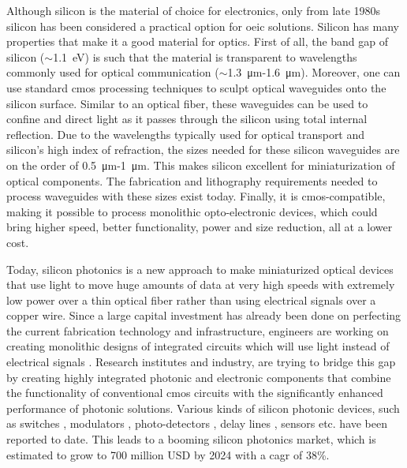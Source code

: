 \documentclass[../report.tex]{subfiles}
\begin{document}
Although silicon is the material of choice for electronics, only from late 1980s silicon has been considered a practical option for \gls{oeic} solutions. Silicon has many properties that make it a good material for optics. First of all, the band gap of silicon ($\sim$\SI{1.1}{\electronvolt}) is such that the material is transparent to wavelengths commonly used for optical communication ($\sim$\SI{1.3}{\micro\metre}-\SI{1.6}{\micro\metre}). Moreover, one can use standard \gls{cmos} processing techniques to sculpt optical waveguides onto the silicon surface. Similar to an optical fiber, these waveguides can be used to confine and direct light as it passes through the silicon \cite{reed_silicon_2004} using total internal reflection. Due to the wavelengths typically used for optical transport and silicon’s high index of refraction, the sizes needed for these silicon waveguides are on the order of \SI{0.5}{\micro\metre}-\SI{1}{\micro\metre}. This makes silicon excellent for miniaturization of optical components. The fabrication and lithography requirements needed to process waveguides with these sizes exist today. Finally, it is \gls{cmos}-compatible, making it possible to process monolithic opto-electronic devices, which could bring higher speed, better functionality, power and size reduction, all at a lower cost. \par

Today, silicon photonics is a new approach to make miniaturized optical devices that use light to move huge amounts of data at very high speeds with extremely low power over a thin optical fiber rather than using electrical signals over a copper wire. Since a large capital investment has already been done on perfecting the current fabrication technology and infrastructure, engineers are working on creating monolithic designs of integrated circuits which will use light instead of electrical signals \cite{optical_linking}. Research institutes and industry, are trying to bridge this gap by creating highly integrated photonic and electronic components that combine the functionality of conventional \gls{cmos} circuits with the significantly enhanced performance of photonic solutions. Various kinds of silicon photonic devices, such as switches \cite{stabile_integrated_2016,wu_mems-enabled_2015,nikolova_scaling_2015,lu_low-power_2014}, modulators \cite{dong_silicon_2015,chen_generation_2013}, photo-detectors \cite{urino_demonstration_2012,chang_high-power_2015}, delay lines \cite{garcia_design_2015,mattarei_variable_2014}, sensors \cite{janz_silicon_2007,lim_laser_2010,ryckeboer_glucose_2014} etc. have been reported to date. This leads to a booming silicon photonics market, which is estimated to grow to 700 million USD by 2024 \cite{jalali_silicon_2006,silicon_photonics_growth_2015} with a \gls{cagr} of 38\%.
\end{document}
